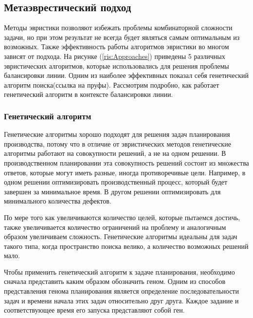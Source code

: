 \subsection{Метаэврестический подход}

Методы эвристики позволяют избежать проблемы комбинаторной сложности задачи, но при этом результат не всегда будет являться самым оптимальным из возможных. Также эффективность работы алгоритмов эвристики во многом зависят от подхода. На рисунке (\ref{ris:Approaches}) приведены 5 различных эвристических алгоритмов, которые использовались для решения проблемы балансировки линии. Одним из наиболее эффективных показал себя генетический алгоритм поиска(ссылка на пруфы). Рассмотрим подробно, как работает генетический алгоритм в контексте балансировки линии.

\subsubsection{Генетический алгоритм}

Генетические алгоритмы хорошо подходят для решения задач планирования производства, потому что в отличие от эвристических методов генетические алгоритмы работают на совокупности решений, а не на одном решении. В производственном планировании эта совокупность решений состоит из множества ответов, которые могут иметь разные, иногда противоречивые цели. Например, в одном решении оптимизировать производственный процесс, который будет завершен за минимальное время. В другом решении оптимизировать для минимального количества дефектов.

По мере того как увеличиваются количество целей, которые пытаемся достичь, также увеличивается количество ограничений на проблему и аналогичным образом увеличиваем сложность. Генетические алгоритмы идеальны для задач такого типа, когда пространство поиска велико, а количество возможных решений мало.

Чтобы применить генетический алгоритм к задаче планирования, необходимо сначала представить каким образом обозначить геном. Одним из способов представления генома планирования является определение последовательности задач и времени начала этих задач относительно друг друга. Каждое задание и соответствующее время его запуска представляют собой ген.

